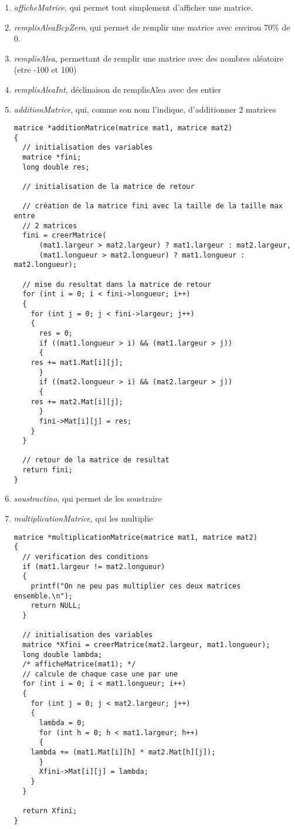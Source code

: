 \documentclass[letter]{article}
\begin{document}
\begin{enumerate}
\begin{enumerate}
\item \emph{afficheMatrice}, qui permet tout simplement d'afficher une matrice.

\item \emph{remplisAleaBcpZero}, qui permet de remplir une matrice avec environ 70\% de 0.

\item \emph{remplisAlea}, permettant de remplir une matrice avec des nombres aléatoire (etre -100 et 100)

\item \emph{remplisAleaInt}, déclinaison de remplisAlea avec des entier

\item \emph{additionMatrice}, qui, comme son nom l'indique, d'additionner 2 matrices
\begin{verbatim}
matrice *additionMatrice(matrice mat1, matrice mat2)
{
  // initialisation des variables
  matrice *fini;
  long double res;

  // initialisation de la matrice de retour

  // création de la matrice fini avec la taille de la taille max entre
  // 2 matrices
  fini = creerMatrice(
      (mat1.largeur > mat2.largeur) ? mat1.largeur : mat2.largeur,
      (mat1.longueur > mat2.longueur) ? mat1.longueur : mat2.longueur);

  // mise du resultat dans la matrice de retour
  for (int i = 0; i < fini->longueur; i++)
  {
    for (int j = 0; j < fini->largeur; j++)
    {
      res = 0;
      if ((mat1.longueur > i) && (mat1.largeur > j))
      {
	res += mat1.Mat[i][j];
      }
      if ((mat2.longueur > i) && (mat2.largeur > j))
      {
	res += mat2.Mat[i][j];
      }
      fini->Mat[i][j] = res;
    }
  }

  // retour de la matrice de resultat
  return fini;
}
\end{verbatim}

\item \emph{soustractino}, qui permet de les soustraire

\item \emph{multiplicationMatrice}, qui les multiplie
\begin{verbatim}
matrice *multiplicationMatrice(matrice mat1, matrice mat2)
{
  // verification des conditions
  if (mat1.largeur != mat2.longueur)
  {
    printf("On ne peu pas multiplier ces deux matrices ensemble.\n");
    return NULL;
  }

  // initialisation des variables
  matrice *Xfini = creerMatrice(mat2.largeur, mat1.longueur);
  long double lambda;
  /* afficheMatrice(mat1); */
  // calcule de chaque case une par une
  for (int i = 0; i < mat1.longueur; i++)
  {
    for (int j = 0; j < mat2.largeur; j++)
    {
      lambda = 0;
      for (int h = 0; h < mat1.largeur; h++)
      {
	lambda += (mat1.Mat[i][h] * mat2.Mat[h][j]);
      }
      Xfini->Mat[i][j] = lambda;
    }
  }

  return Xfini;
}
\end{verbatim}
\end{enumerate}
\end{enumerate}
\end{document}
